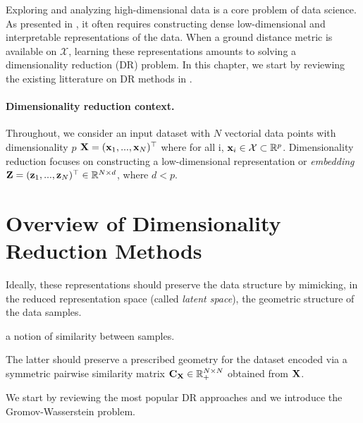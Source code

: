 \newpage

Exploring and analyzing high-dimensional data is a core problem of data science. As presented in , it often requires constructing dense low-dimensional and interpretable representations of the data. When a ground distance metric is available on $\mathcal{X}$, learning these representations amounts to solving a dimensionality reduction (DR) problem. In this chapter, we start by reviewing the existing litterature on DR methods in .

\paragraph{Dimensionality reduction context.}
Throughout, we consider an input dataset with $N$ vectorial data points with dimensionality $p$ \ie ${\mathbf{X}} = ({\mathbf{x}}_1, ..., {\mathbf{x}}_N) ^\top$ where for all i, ${\mathbf{x}}_i \in \mathcal{X} \subset \mathbb{R}^{p}$. Dimensionality reduction focuses on constructing a low-dimensional representation or \emph{embedding} ${\mathbf{Z}} = ({\mathbf{z}}_1, ..., {\mathbf{z}}_N)^\top \in \mathbb{R}^{N \times d}$, where $d< p$. 

\section{Overview of Dimensionality Reduction Methods}\label{sec:background_dr}

Ideally, these representations should preserve the data structure by mimicking, in the reduced representation space (called \emph{latent space}), the geometric structure of the data samples. 

a notion of similarity between samples.

The latter should preserve a prescribed geometry for the dataset encoded via a symmetric pairwise similarity matrix ${\mathbf{C}}_{{\mathbf{X}}} \in \mathbb{R}_+^{N \times N}$ obtained from ${\mathbf{X}}$.

We start by reviewing the most popular DR approaches and we introduce the Gromov-Wasserstein problem.


